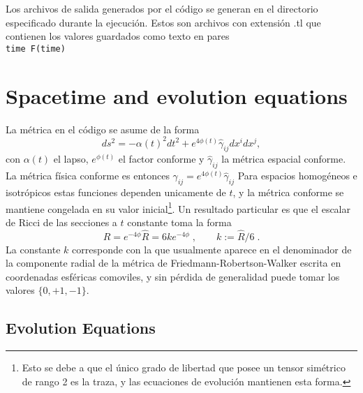 \documentclass[12pt,fleqn,b5paper]{article}
\begin{document}
Los archivos de salida generados por el código se generan en el
directorio especificado durante la ejecución. Estos son archivos con
extensión .tl que contienen los valores guardados como texto en pares \\

\texttt{time    F(time)}
\\




\setcounter{equation}{0}
\section{Spacetime and evolution equations}

La métrica en el código se asume de la forma
\begin{equation}
ds^2 = -\alpha(t)^{2} dt^2 + e^{4\phi(t)}{\hat\gamma}_{ij} dx^i dx^j  ,
\end{equation}
con $\alpha(t)$ el lapso, $e^{\phi(t)}$ el factor conforme y
${\hat\gamma}_{ij}$ la métrica espacial conforme. La métrica física
conforme es entonces $\gamma_{ij}=e^{4\phi(t)}{\hat\gamma}_{ij}$ Para
espacios homogéneos e isotrópicos estas funciones dependen unicamente
de $t$, y la métrica conforme se mantiene congelada en su valor
inicial\footnote{Esto se debe a que el único grado de libertad que
  posee un tensor simétrico de rango 2 es la traza, y las ecuaciones
  de evolución mantienen esta forma. }. Un resultado particular es que
el escalar de Ricci de las secciones a $t$ constante toma la forma
\begin{equation}
  \label{eq:Ricci}
  R= e^{-4\phi}\hat R = 6 k e^{-4\phi} \;,\qquad k:= \hat R/6\;.
\end{equation}
La constante $k$ corresponde con la que usualmente aparece en el
denominador de la componente radial de la métrica de
Friedmann-Robertson-Walker escrita en coordenadas esféricas comoviles,
y sin pérdida de generalidad puede tomar los valores $\{0,+1,-1\}$.

\subsection{Evolution Equations}
\end{document}
